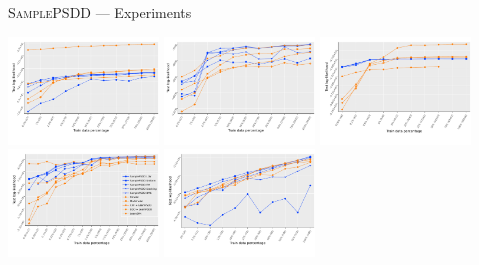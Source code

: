 \documentclass[aspectratio=169]{beamer}
\begin{document}
\begin{frame}[fragile]{\textsc{SamplePSDD} --- Experiments}
\begin{center}
  \includegraphics[width=0.3\textwidth]{figures/sushi_ranking.pdf}
  \includegraphics[width=0.3\textwidth]{figures/sushi_choose.pdf}
  \includegraphics[width=0.3\textwidth]{figures/dota.pdf}\\

  \includegraphics[width=0.3\textwidth]{figures/led.pdf}
  \includegraphics[width=0.3\textwidth]{figures/led_pixels.pdf}
\end{center}

\textcolor{darker gray}{\tiny\cite{mattei20b,kamishima03,shen17,choi15,gens13,dang20}}
\end{frame}

\fi

\end{document}
